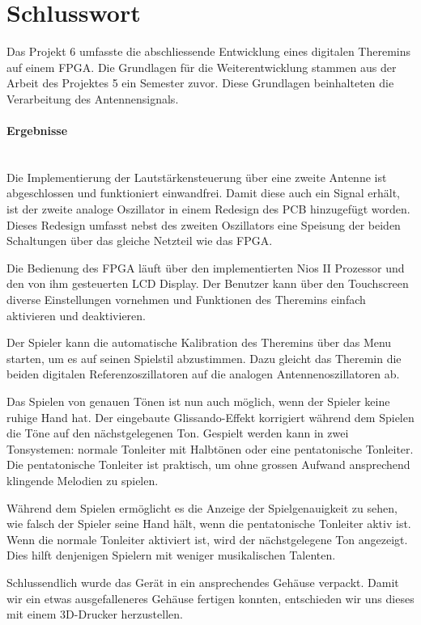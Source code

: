 \clearpage
\section{Schlusswort}\label{sec:Schlusswort}
Das Projekt 6 umfasste die abschliessende Entwicklung eines digitalen Theremins auf einem FPGA. Die Grundlagen für die Weiterentwicklung stammen aus der Arbeit des Projektes 5 ein Semester zuvor. Diese Grundlagen beinhalteten die Verarbeitung des Antennensignals. 

\paragraph{Ergebnisse}\mbox{}\\

Die Implementierung der Lautstärkensteuerung über eine zweite Antenne ist abgeschlossen und funktioniert einwandfrei. 
Damit diese auch ein Signal erhält, ist der zweite analoge Oszillator in einem Redesign des PCB hinzugefügt worden. Dieses Redesign umfasst nebst des zweiten Oszillators eine Speisung der beiden Schaltungen über das gleiche Netzteil wie das FPGA.

Die Bedienung des FPGA läuft über den implementierten Nios II Prozessor und den von ihm gesteuerten LCD Display. Der Benutzer kann über den Touchscreen diverse Einstellungen vornehmen und Funktionen des Theremins einfach aktivieren und deaktivieren.

Der Spieler kann die automatische Kalibration des Theremins über das Menu starten, um es auf seinen Spielstil abzustimmen. Dazu gleicht das Theremin die beiden digitalen Referenzoszillatoren auf die analogen Antennenoszillatoren ab.

Das Spielen von genauen Tönen ist nun auch möglich, wenn der Spieler keine ruhige Hand hat. Der eingebaute Glissando-Effekt korrigiert während dem Spielen die Töne auf den nächstgelegenen Ton. Gespielt werden kann in zwei Tonsystemen: normale Tonleiter mit Halbtönen oder eine pentatonische Tonleiter. Die pentatonische Tonleiter ist praktisch, um ohne grossen Aufwand ansprechend klingende Melodien zu spielen. 

Während dem Spielen ermöglicht es die Anzeige der Spielgenauigkeit zu sehen, wie falsch der Spieler seine Hand hält, wenn die pentatonische Tonleiter aktiv ist. Wenn die normale Tonleiter aktiviert ist, wird der nächstgelegene Ton angezeigt. Dies hilft denjenigen Spielern mit weniger musikalischen Talenten.

Schlussendlich wurde das Gerät in ein ansprechendes Gehäuse verpackt. Damit wir ein etwas ausgefalleneres Gehäuse fertigen konnten, entschieden wir uns dieses mit einem 3D-Drucker herzustellen.

